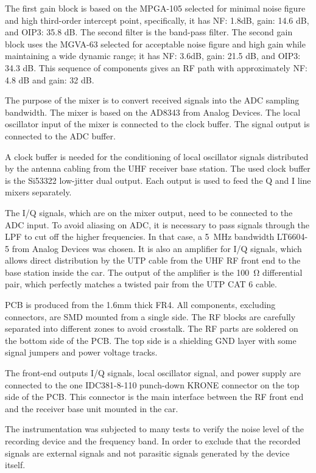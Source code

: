 The first gain block is based on the MPGA-105 selected for minimal noise figure and high third-order intercept point, specifically, it has NF: 1.8dB, gain: 14.6 dB, and OIP3: 35.8 dB. The second filter is the band-pass filter.  The second gain block uses the MGVA-63 selected for acceptable noise figure and high gain while maintaining a wide dynamic range; it has NF: 3.6dB,  gain: 21.5 dB, and OIP3: 34.3 dB.  This sequence of components gives an RF path with approximately NF: 4.8 dB and gain: 32 dB.

The purpose of the mixer is to convert received signals into the ADC sampling bandwidth. The mixer is based on the AD8343 from Analog Devices. The local oscillator input of the mixer is connected to the clock buffer. The signal output is connected to the ADC buffer.

A clock buffer is needed for the conditioning of local oscillator signals distributed by the antenna cabling from the UHF receiver base station.  The used clock buffer is the Si53322 low-jitter dual output. Each output is used to feed the Q and I line mixers separately.

The I/Q signals, which are on the mixer output, need to be connected to the ADC input. To avoid aliasing on ADC, it is necessary to pass signals through the LPF to cut off the higher frequencies. In that case, a 5~MHz bandwidth LT6604-5 from Analog Devices was chosen. It is also an amplifier for I/Q signals, which allows direct distribution by the UTP cable from the UHF RF front end to the base station inside the car. The output of the amplifier is the 100~Ω differential pair, which perfectly matches a twisted pair from the UTP CAT 6 cable.

PCB is produced from the 1.6mm thick FR4. All components, excluding connectors, are SMD mounted from a single side. The RF blocks are carefully separated into different zones to avoid crosstalk. The RF parts are soldered on the bottom side of the PCB. The top side is a shielding GND layer with some signal jumpers and power voltage tracks.

The front-end outputs I/Q signals, local oscillator signal, and power supply are connected to the one IDC381-8-110 punch-down KRONE connector on the top side of the PCB. This connector is the main interface between the RF front end and the receiver base unit mounted in the car. 

The instrumentation was subjected to many tests to verify the noise level of the recording device and the frequency band. In order to exclude that the recorded signals are external signals and not parasitic signals generated by the device itself.

